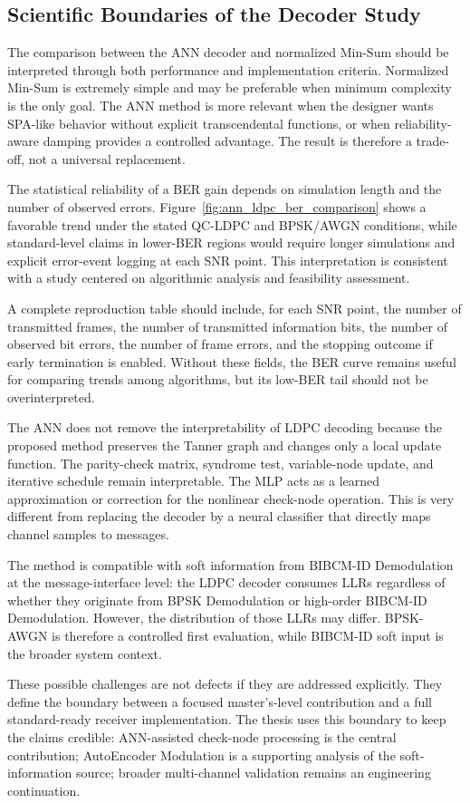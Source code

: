 \subsection{Scientific Boundaries of the Decoder Study}
The comparison between the ANN decoder and normalized Min-Sum should be interpreted through both performance and implementation criteria. Normalized Min-Sum is extremely simple and may be preferable when minimum complexity is the only goal. The ANN method is more relevant when the designer wants SPA-like behavior without explicit transcendental functions, or when reliability-aware damping provides a controlled advantage. The result is therefore a trade-off, not a universal replacement.

The statistical reliability of a BER gain depends on simulation length and the number of observed errors. Figure~\ref{fig:ann_ldpc_ber_comparison} shows a favorable trend under the stated QC-LDPC and BPSK/AWGN conditions, while standard-level claims in lower-BER regions would require longer simulations and explicit error-event logging at each SNR point. This interpretation is consistent with a study centered on algorithmic analysis and feasibility assessment.

A complete reproduction table should include, for each SNR point, the number of transmitted frames, the number of transmitted information bits, the number of observed bit errors, the number of frame errors, and the stopping outcome if early termination is enabled. Without these fields, the BER curve remains useful for comparing trends among algorithms, but its low-BER tail should not be overinterpreted.

The ANN does not remove the interpretability of LDPC decoding because the proposed method preserves the Tanner graph and changes only a local update function. The parity-check matrix, syndrome test, variable-node update, and iterative schedule remain interpretable. The MLP acts as a learned approximation or correction for the nonlinear check-node operation. This is very different from replacing the decoder by a neural classifier that directly maps channel samples to messages.

The method is compatible with soft information from BIBCM-ID Demodulation at the message-interface level: the LDPC decoder consumes LLRs regardless of whether they originate from BPSK Demodulation or high-order BIBCM-ID Demodulation. However, the distribution of those LLRs may differ. BPSK-AWGN is therefore a controlled first evaluation, while BIBCM-ID soft input is the broader system context.

These possible challenges are not defects if they are addressed explicitly. They define the boundary between a focused master's-level contribution and a full standard-ready receiver implementation. The thesis uses this boundary to keep the claims credible: ANN-assisted check-node processing is the central contribution; AutoEncoder Modulation is a supporting analysis of the soft-information source; broader multi-channel validation remains an engineering continuation.
